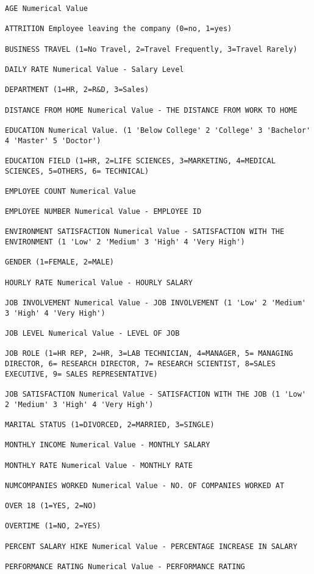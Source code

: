 \documentclass[11pt]{article}
\begin{document}
\begin{verbatim}
AGE Numerical Value

ATTRITION Employee leaving the company (0=no, 1=yes)

BUSINESS TRAVEL (1=No Travel, 2=Travel Frequently, 3=Travel Rarely)

DAILY RATE Numerical Value - Salary Level

DEPARTMENT (1=HR, 2=R&D, 3=Sales)

DISTANCE FROM HOME Numerical Value - THE DISTANCE FROM WORK TO HOME

EDUCATION Numerical Value. (1 'Below College' 2 'College' 3 'Bachelor' 4 'Master' 5 'Doctor')

EDUCATION FIELD (1=HR, 2=LIFE SCIENCES, 3=MARKETING, 4=MEDICAL SCIENCES, 5=OTHERS, 6= TECHNICAL)

EMPLOYEE COUNT Numerical Value

EMPLOYEE NUMBER Numerical Value - EMPLOYEE ID

ENVIRONMENT SATISFACTION Numerical Value - SATISFACTION WITH THE ENVIRONMENT (1 'Low' 2 'Medium' 3 'High' 4 'Very High')

GENDER (1=FEMALE, 2=MALE)

HOURLY RATE Numerical Value - HOURLY SALARY

JOB INVOLVEMENT Numerical Value - JOB INVOLVEMENT (1 'Low' 2 'Medium' 3 'High' 4 'Very High')

JOB LEVEL Numerical Value - LEVEL OF JOB

JOB ROLE (1=HR REP, 2=HR, 3=LAB TECHNICIAN, 4=MANAGER, 5= MANAGING DIRECTOR, 6= RESEARCH DIRECTOR, 7= RESEARCH SCIENTIST, 8=SALES EXECUTIVE, 9= SALES REPRESENTATIVE)

JOB SATISFACTION Numerical Value - SATISFACTION WITH THE JOB (1 'Low' 2 'Medium' 3 'High' 4 'Very High')

MARITAL STATUS (1=DIVORCED, 2=MARRIED, 3=SINGLE)

MONTHLY INCOME Numerical Value - MONTHLY SALARY

MONTHLY RATE Numerical Value - MONTHLY RATE

NUMCOMPANIES WORKED Numerical Value - NO. OF COMPANIES WORKED AT

OVER 18 (1=YES, 2=NO)

OVERTIME (1=NO, 2=YES)

PERCENT SALARY HIKE Numerical Value - PERCENTAGE INCREASE IN SALARY

PERFORMANCE RATING Numerical Value - PERFORMANCE RATING


\end{verbatim}
\end{document}
